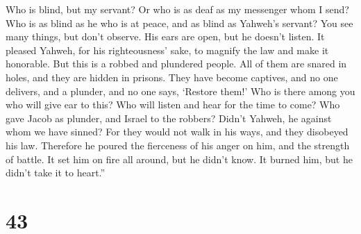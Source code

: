  Who is blind, but my servant? Or who is as deaf as my
messenger whom I send? Who is as blind as he who is at peace, and as
blind as Yahweh's servant?  You see many things, but don't
observe. His ears are open, but he doesn't listen.  It
pleased Yahweh, for his righteousness' sake, to magnify the law and make
it honorable.  But this is a robbed and plundered people.
All of them are snared in holes, and they are hidden in prisons. They
have become captives, and no one delivers, and a plunder, and no one
says, `Restore them!'  Who is there among you who will give
ear to this? Who will listen and hear for the time to come?
 Who gave Jacob as plunder, and Israel to the robbers?
Didn't Yahweh, he against whom we have sinned? For they would not walk
in his ways, and they disobeyed his law.  Therefore he
poured the fierceness of his anger on him, and the strength of battle.
It set him on fire all around, but he didn't know. It burned him, but he
didn't take it to heart.''

\hypertarget{section-41}{%
\section{43}\label{section-41}}


